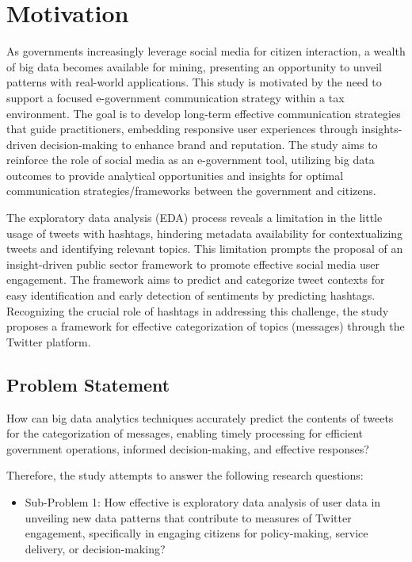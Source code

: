 \section{Motivation}
\label{sec:first:motivation}

As governments increasingly leverage social media for citizen interaction, a wealth of big data becomes available for mining, presenting an opportunity to unveil patterns with real-world applications. This study is motivated by the need to support a focused e-government communication strategy within a tax environment. The goal is to develop long-term effective communication strategies that guide practitioners, embedding responsive user experiences through insights-driven decision-making to enhance brand and reputation. The study aims to reinforce the role of social media as an e-government tool, utilizing big data outcomes to provide analytical opportunities and insights for optimal communication strategies/frameworks between the government and citizens.

The exploratory data analysis (EDA) process reveals a limitation in the little usage of tweets with hashtags, hindering metadata availability for contextualizing tweets and identifying relevant topics. This limitation prompts the proposal of an insight-driven public sector framework to promote effective social media user engagement. The framework aims to predict and categorize tweet contexts for easy identification and early detection of sentiments by predicting hashtags. Recognizing the crucial role of hashtags in addressing this challenge, the study proposes a framework for effective categorization of topics (messages) through the Twitter platform.

\subsection{Problem Statement}
How can big data analytics techniques accurately predict the contents of tweets for the categorization of messages, enabling timely processing for efficient government operations, informed decision-making, and effective responses?

Therefore, the study attempts to answer the following research questions:

\begin{itemize}
    \item Sub-Problem 1:  How effective is exploratory data analysis of user data in unveiling new data patterns that contribute to measures of Twitter engagement, specifically in engaging citizens for policy-making, service delivery, or decision-making?
    \end{itemize}

